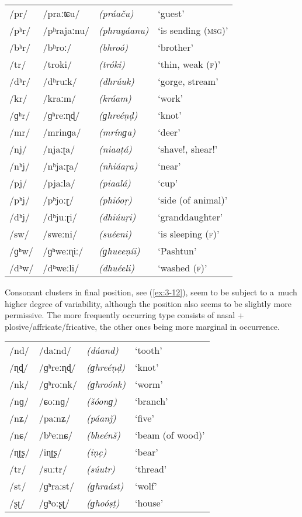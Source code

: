 \begin{exe}
\extab
\label{ex:3-11}
\begin{tabular}{ l l l l }
/pr/ &
/praːʨu/ &
\textit{(práaču)} &
`guest'\\
/pʰr/ &
/pʰrajaːnu/ &
\textit{(phrayáanu)} &
`is sending (\textsc{msg)}'\\
/bʰr/ &
/bʰroː/ &
\textit{(bhroó)} &
`brother'\\
/tr/ &
/troki/ &
\textit{(tróki)} &
`thin, weak (\textsc{f)}'\\
/dʰr/ &
/dʰruːk/ &
\textit{(dhrúuk)} &
`gorge, stream' \\
/kr/ &
/kraːm/ &
\textit{(kráam)} &
`work' \\
/ɡʰr/ &
/ɡʰreːɳɖ/ &
\textit{(ɡhreéṇḍ)} &
`knot' \\
/mr/ &
/mrinɡa/ &
\textit{(mrínɡa)} &
`deer'\\
/nj/ &
/njaːʈa/ &
\textit{(niaaṭá)} &
`shave!, shear!' \\
/nʰj/ &
/nʰjaːɽa/ &
\textit{(nhiáaṛa)} &
`near'\\
/pj/ &
/pjaːla/ &
\textit{(piaalá)} &
`cup'\\
/pʰj/ &
/pʰjoːɽ/ &
\textit{(phióoṛ)} &
`side (of animal)' \\
/dʰj/ &
/dʰjuːɽi/ &
\textit{(dhiúuṛi)} &
`granddaughter'\\
/sw/ &
/sweːni/ &
\textit{(suéeni) } &
`is sleeping (\textsc{f)}'\\
/ɡʰw/ &
/ɡʰweːɳiː/ &
\textit{(ɡhueeṇíi)} &
`Pashtun'\\
/dʰw/ &
/dʰweːli/ &
\textit{(dhuéeli)} &
`washed (\textsc{f)}'\\
\end{tabular}
\end{exe}


Consonant clusters in final position, see (\ref{ex:3-12}), seem to be subject to a~much higher degree of variability, although the position also seems to be slightly more permissive. The more frequently occurring type consists of nasal + plosive/affricate/fricative, the other ones being more marginal in occurrence. 


\begin{exe}
\extab
\label{ex:3-12}
\begin{tabular}{ l l l l }
/nd/ &
/daːnd/ &
\textit{(dáand)} &
`tooth'\\
/ɳɖ/ &
/ɡʰreːɳɖ/ &
\textit{(ɡhreéṇḍ)} &
`knot'\\
/nk/ &
/ɡʰroːnk/ &
\textit{(ɡhroónk)} &
`worm'\\
/nɡ/ &
/ɕoːnɡ/ &
\textit{(šóonɡ) } &
`branch'\\
/nʑ/ &
/paːnʑ/ &
\textit{(páanǰ) } &
`five' \\
/nɕ/ &
/bʰeːnɕ/ &
\textit{(bheénš) } &
`beam (of wood)' \\
/ɳʈʂ/ &
/iɳʈʂ/ &
\textit{(iṇc̣) } &
`bear' \\
/tr/ &
/suːtr/ &
\textit{(súutr)} &
`thread' \\
/st/ &
/ɡʰraːst/ &
\textit{(ɡhraást)} &
`wolf' \\
/ʂʈ/ &
/ɡʰoːʂʈ/ &
\textit{(ɡhoóṣṭ) } &
`house'\\
\end{tabular}
\end{exe}


